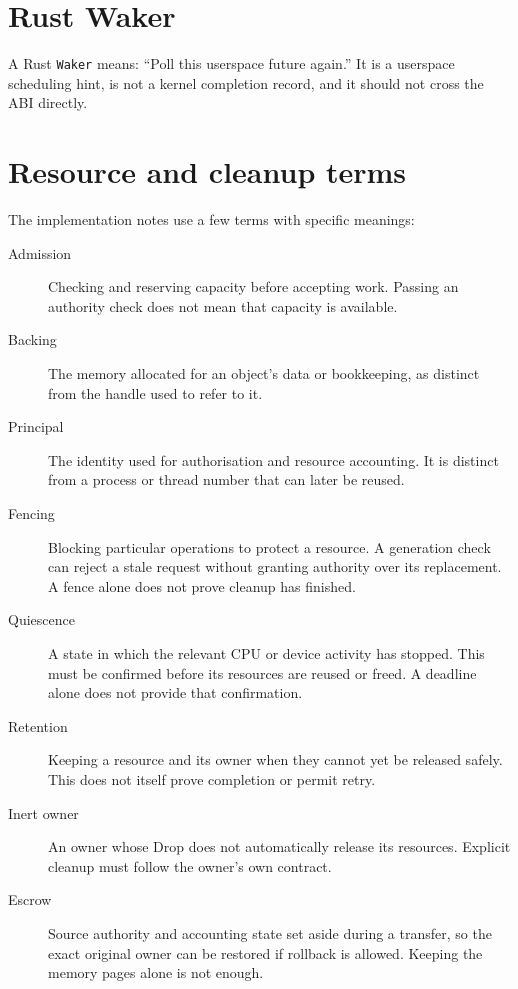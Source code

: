 \section{Rust Waker}

A Rust \texttt{Waker} means: ``Poll this userspace future again.'' It is a
userspace scheduling hint, is not a kernel completion record, and it should not
cross the ABI directly.

\section{Resource and cleanup terms}

The implementation notes use a few terms with specific meanings:

\begin{description}
    \item[Admission] Checking and reserving capacity before accepting work.
        Passing an authority check does not mean that capacity is available.
    \item[Backing] The memory allocated for an object's data or bookkeeping,
        as distinct from the handle used to refer to it.
    \item[Principal] The identity used for authorisation and resource accounting.
        It is distinct from a process or thread number that can later be reused.
    \item[Fencing] Blocking particular operations to protect a resource. A
        generation check can reject a stale request without granting authority
        over its replacement. A fence alone does not prove cleanup has finished.
    \item[Quiescence] A state in which the relevant CPU or device activity has
        stopped. This must be confirmed before its resources are reused or freed.
        A deadline alone does not provide that confirmation.
    \item[Retention] Keeping a resource and its owner when they cannot yet be
        released safely. This does not itself prove completion or permit retry.
    \item[Inert owner] An owner whose Drop does not automatically release its
        resources. Explicit cleanup must follow the owner's own contract.
    \item[Escrow] Source authority and accounting state set aside during a
        transfer, so the exact original owner can be restored if rollback is
        allowed. Keeping the memory pages alone is not enough.
\end{description}


